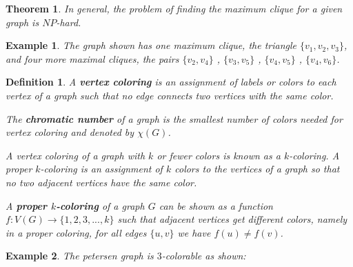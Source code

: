 \documentclass[12pt]{article}
\theoremstyle{slplain}
\newtheorem{theorem}{Theorem}[section]
\newtheorem{defi}{Definition}[section]
\newtheorem{exam}{Example}[section]
\begin{document}
\begin{theorem}
In general, the problem of finding the maximum clique for a given graph is $NP$-hard\cite{karp}.
\end{theorem}

\begin{exam}
The graph shown has one maximum clique, the triangle $\{v_1 , v_2 , v_3\}$, and four more maximal cliques, the pairs 
$\{v_2 , v_4\}$ , $\{v_3 , v_5\}$ , $\{v_4 , v_5\}$ , $\{v_4 , v_6\}$.
\vspace{1cm}
\begin{center}
\end{center}
\end{exam}

\begin{defi}
A {\bf vertex coloring} is an assignment of labels or colors to each
vertex of a graph such that no edge connects two vertices with the same color.

The {\bf chromatic number} of a graph is the smallest number of colors needed for
vertex coloring and denoted by $\chi(G)$. 

A vertex coloring of a graph with $k$ or fewer colors is known as a $k$-coloring. A proper $k$-coloring is an assignment of $k$ colors to the vertices of a graph so that no two adjacent vertices have the same color. 

A {\bf proper $k$-coloring} of a graph $G$ can be shown as a function $f: V(G) \to \{1, 2, 3, . . . , k\}$ such that adjacent vertices get different colors, namely in a proper coloring, for all edges $\{u, v\}$ we have $f(u) \not= f(v)$.
\end{defi}


\begin{exam}
The petersen graph is $3$-colorable as shown:
\vspace{1cm}
\begin{center}
\end{center}

\end{exam}
\vspace{0.5cm}
\end{document}
